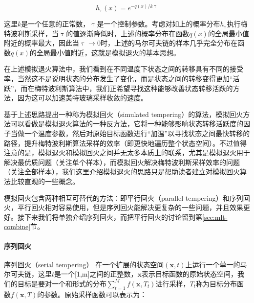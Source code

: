 \begin{equation}
	h_{\uptau}(x)=e^{-q(x)/k\uptau}
\end{equation}

\noindent 这里$k$是一个任意的正常数，$\uptau$是一个控制参数。考虑对如上的概率分布$h_{\uptau}$执行梅特波利斯采样，当$\uptau$的值逐渐降低时，上述的概率分布在函数$q(x)$的全局最小值附近的概率最大，因此当$\uptau\to 0$时，上述的马尔可夫链的样本几乎完全分布在函数$q(x)$的全局最小值附近，这就是模拟退火的基本思想。

在上述模拟退火算法中，我们看到在不同温度下状态之间的转移具有不同的接受率，当然这不是说明状态的分布发生了变化，而是状态之间的转移变得更加“活跃”，而在梅特波利斯算法中，我们正希望寻找这种能够改善状态转移活跃的方法，因为这可以加速美特玻璃采样收敛的速度。

\cite{a:SimulatedTempering:ANewMonteCarloScheme}基于上述思路提出一种称为模拟回火（simulated tempering）的算法，模拟回火方法可以看做是模拟退火算法的一种反方法，它将一种能够影响状态转移活跃度的因子当做一个温度参数，然后对原始目标函数进行“加温”以寻找状态之间最快转移的路径，提升梅特波利斯算法采样的效率（即更快地遍历整个状态空间）。不过值得注意的是，模拟退火和模拟回火之间并无太多本质上的联系，尤其是模拟退火用于解决最优质问题（关注单个样本），而模拟回火解决梅特波利斯采样效率的问题（关注全部样本），我们这里介绍模拟退火的思路只是帮助读者建立对模拟回火算法比较直观的一些概念。

模拟回火包含两种相互可替代的方法：即平行回火（parallel tempering）和序列回火，平行回火\cite{a:markovchainmontecarlomaximumlikelihoodfordependentdata}相对容易使用，但是序列回火能解决更复杂的一些问题，并且效果更好。接下来我们将单独介绍序列回火，而把平行回火的讨论留到第\ref{sec:mlt-combine}节。




\paragraph{序列回火}
序列回火（serial tempering）
\cite{a:SimulatedTempering:ANewMonteCarloScheme,a:AnnealingMarkovChainMonteCarlowithApplicationstoAncestralInference,b:HandbookofMarkovChainMonteCarlo}在一个扩展的状态空间$(\mathbf{x},t)$上运行一个单一的马尔可夫链，这里$t$是一个[1,m]之间的正整数，$\mathbf{x}$表示目标函数的原始状态空间，我们的目标是要对一个和形式的分布$\sum^{M}_{t=1}f(\mathbf{x},T_t)$进行采样，$T_t$称为目标分布函数$f(\mathbf{x},T)$的参数。原始采样函数可以表示为：

